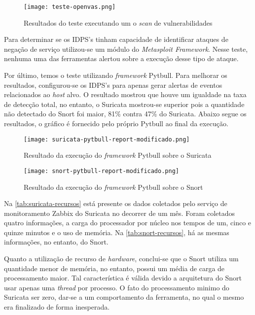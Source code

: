 \begin{figure}[!htb]
    \centering
    \caption{Resultados do teste executando um o \textit{scan} de vulnerabilidades}
    \texttt{[image: teste-openvas.png]}
    \label{fig:teste-openvas}
\end{figure}

Para determinar se os IDPS's tinham capacidade de identificar ataques de negação de serviço utilizou-se um módulo do \textit{Metasploit Framework}. Nesse teste, nenhuma uma das ferramentas alertou sobre a execução desse tipo de ataque. 

Por último, temos o teste utilizando \textit{framework} Pytbull. Para melhorar os resultados, configurou-se os IDPS's para apenas gerar alertas de eventos relacionados ao \textit{host} alvo. O resultado mostrou que houve um igualdade na taxa de detecção total, no entanto, o Suricata mostrou-se superior pois a quantidade não detectado do Snort foi maior, 81\% contra 47\% do Suricata. Abaixo segue os resultados, o gráfico é fornecido pelo próprio Pytbull ao final da execução. 

\begin{figure}[!htb]
\centering
\caption{Resultado da execução do \textit{framework} Pytbull sobre o Suricata}
\texttt{[image: suricata-pytbull-report-modificado.png]}
\label{fig:suricata-pytbull-report}
\end{figure}

\begin{figure}[!htb]
\centering
\caption{Resultado da execução do \textit{framework} Pytbull sobre o Snort}
\texttt{[image: snort-pytbull-report-modificado.png]}
\label{fig:snort-pytbull-report}
\end{figure}

Na \autoref{tab:suricata-recursos} está presente os dados coletados pelo serviço de monitoramento Zabbix do Suricata no decorrer de um mês. Foram coletados quatro informações, a carga do processador por núcleo nos tempos de um, cinco e quinze minutos e o uso de memória. Na \autoref{tab:snort-recursos}, há as mesmas informações, no entanto, do Snort.

Quanto a utilização de recurso de \textit{hardware}, conclui-se que o Snort utiliza um quantidade menor de memória, no entanto, possui um média de carga de processamento maior. Tal característica é válida devido a arquitetura do Snort usar apenas uma \textit{thread} por processo. O fato do processamento minimo do Suricata ser zero, dar-se a um comportamento da ferramenta, no qual o mesmo era finalizado de forma inesperada.  


